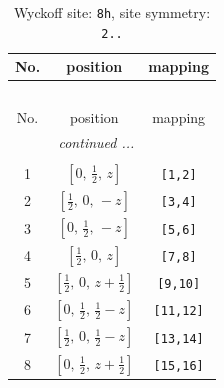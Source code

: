 \documentclass[fleqn,8pt]{jsarticle}
\begin{document}
\begin{longtable}{ccc}
\caption{Wyckoff site: {\tt 8h}, site symmetry: {\tt 2..}}
 \\
 \hline \hline
No. & position & mapping \\ \hline \endfirsthead

\multicolumn{2}{l}{\tablename\ \thetable{}} \\
 \hline \hline
No. & position & mapping \\ \hline \endhead

 \hline \hline
\multicolumn{2}{r}{\footnotesize\it continued ...} \\ \endfoot

 \hline \hline
\multicolumn{2}{r}{} \\ \endlastfoot

1 & $\left[ 0,\, \frac{1}{2},\, z \right]$ & {\tt [1,2]} \\ \hline
2 & $\left[ \frac{1}{2},\, 0,\, - z \right]$ & {\tt [3,4]} \\ \hline
3 & $\left[ 0,\, \frac{1}{2},\, - z \right]$ & {\tt [5,6]} \\ \hline
4 & $\left[ \frac{1}{2},\, 0,\, z \right]$ & {\tt [7,8]} \\ \hline
5 & $\left[ \frac{1}{2},\, 0,\, z + \frac{1}{2} \right]$ & {\tt [9,10]} \\ \hline
6 & $\left[ 0,\, \frac{1}{2},\, \frac{1}{2} - z \right]$ & {\tt [11,12]} \\ \hline
7 & $\left[ \frac{1}{2},\, 0,\, \frac{1}{2} - z \right]$ & {\tt [13,14]} \\ \hline
8 & $\left[ 0,\, \frac{1}{2},\, z + \frac{1}{2} \right]$ & {\tt [15,16]} \\
\end{longtable}
\renewcommand{\arraystretch}{1.2}
\end{document}
